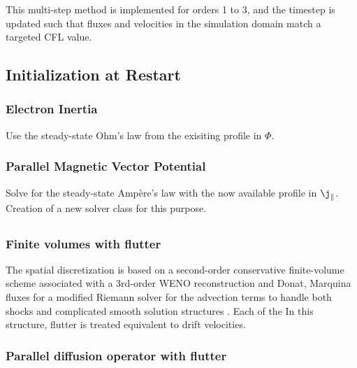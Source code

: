 This multi-step method is implemented for orders 1 to 3, and the timestep is updated such that fluxes and velocities in the simulation domain match a targeted CFL value. \newline



\subsection{Initialization at Restart}
\subsubsection{Electron Inertia}
Use the steady-state Ohm's law from the exisiting profile in $\Phi$.

\subsubsection{Parallel Magnetic Vector Potential}
Solve for the steady-state Ampère's law with the now available profile in $\j_\parallel$. Creation of a new solver class for this purpose.


\subsection{}


\subsubsection{Finite volumes with flutter}

The spatial discretization is based on a second-order conservative finite-volume scheme associated with a 3rd-order WENO reconstruction and Donat, Marquina fluxes for a modified Riemann solver for the advection terms to handle both shocks and complicated smooth solution structures \cite{tamain2016tokam3x, Bufferand2021}. \newline
Each of the In this structure, flutter is treated equivalent to drift velocities. 



\subsubsection{Parallel diffusion operator with flutter}
\label{ssec:3DGunter}

